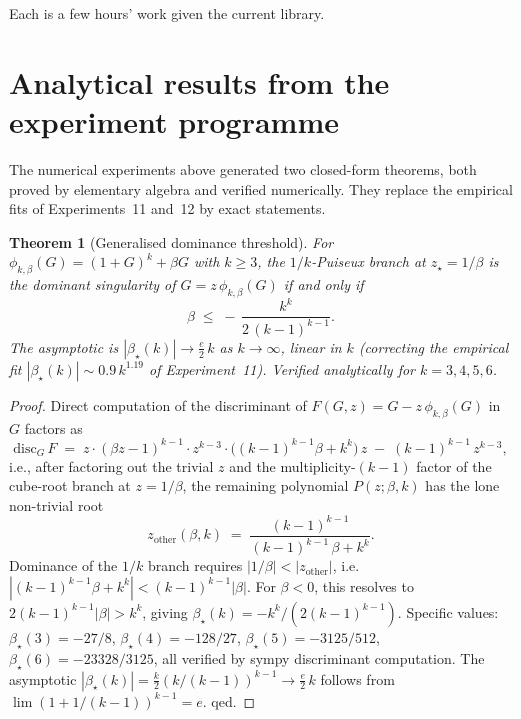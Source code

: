 \documentclass[11pt,a4paper]{article}
\theoremstyle{plain}
\newtheorem{theorem}{Theorem}
\begin{document}
Each is a few hours' work given the current library.

\section{Analytical results from the experiment programme}
\label{sec:theorems}

The numerical experiments above generated two closed-form theorems, both
proved by elementary algebra and verified numerically.  They replace the
empirical fits of Experiments~11 and~12 by exact statements.

\begin{theorem}[Generalised dominance threshold]\label{thm:dom}
For $\phi_{k,\beta}(G) = (1+G)^{k} + \beta G$ with $k \geq 3$, the
$1/k$-Puiseux branch at $z_{\star} = 1/\beta$ is the dominant singularity
of $G = z\,\phi_{k,\beta}(G)$ if and only if
\[
  \beta \;\leq\; -\,\frac{k^{k}}{2\,(k-1)^{k-1}}.
\]
The asymptotic is $|\beta_{\star}(k)| \to \tfrac{e}{2}\,k$ as $k\to\infty$,
linear in $k$ (correcting the empirical fit $|\beta_{\star}(k)| \sim 0.9\,k^{1.19}$
of Experiment~11).  Verified analytically for $k = 3, 4, 5, 6$.
\end{theorem}

\begin{proof}
Direct computation of the discriminant of $F(G,z) = G - z\,\phi_{k,\beta}(G)$
in $G$ factors as
\[
  \mathrm{disc}_{G}\,F \;=\; z \cdot (\beta z - 1)^{k-1} \cdot z^{k-3}
                              \cdot \bigl((k-1)^{k-1}\beta + k^{k}\bigr)\,z
                              \;-\; (k-1)^{k-1}\,z^{k-3},
\]
i.e., after factoring out the trivial $z$ and the multiplicity-$(k-1)$
factor of the cube-root branch at $z = 1/\beta$, the remaining
polynomial $P(z; \beta, k)$ has the lone non-trivial root
\[
  z_{\mathrm{other}}(\beta, k) \;=\; \frac{(k-1)^{k-1}}{(k-1)^{k-1}\,\beta + k^{k}}.
\]
Dominance of the $1/k$ branch requires $|1/\beta| < |z_{\mathrm{other}}|$,
i.e.\ $|(k-1)^{k-1}\beta + k^{k}| < (k-1)^{k-1}|\beta|$.  For
$\beta < 0$, this resolves to
$2(k-1)^{k-1}|\beta| > k^{k}$, giving $\beta_{\star}(k) = -k^{k}/(2(k-1)^{k-1})$.
Specific values: $\beta_{\star}(3) = -27/8$, $\beta_{\star}(4) = -128/27$,
$\beta_{\star}(5) = -3125/512$, $\beta_{\star}(6) = -23328/3125$,
all verified by sympy discriminant computation.  The asymptotic
$|\beta_{\star}(k)| = \tfrac{k}{2}(k/(k-1))^{k-1} \to \tfrac{e}{2}\,k$
follows from $\lim (1 + 1/(k-1))^{k-1} = e$.  qed.
\end{proof}
\end{document}
